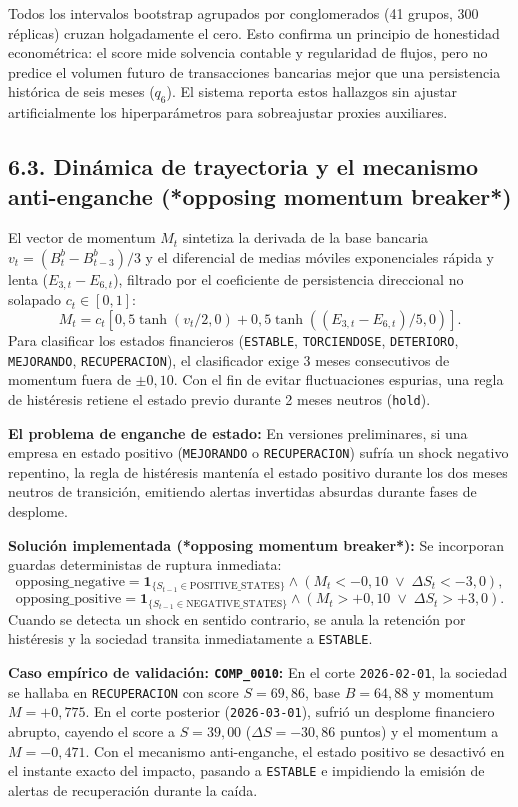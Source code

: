 \documentclass[10pt,a4paper]{article}
\begin{document}
Todos los intervalos bootstrap agrupados por conglomerados (41 grupos, 300 réplicas) cruzan holgadamente el cero. Esto confirma un principio de honestidad econométrica: el score mide solvencia contable y regularidad de flujos, pero no predice el volumen futuro de transacciones bancarias mejor que una persistencia histórica de seis meses ($q_6$). El sistema reporta estos hallazgos sin ajustar artificialmente los hiperparámetros para sobreajustar proxies auxiliares.

\subsection*{6.3. Dinámica de trayectoria y el mecanismo anti-enganche (*opposing momentum breaker*)}
El vector de momentum $M_t$ sintetiza la derivada de la base bancaria $v_t = (B_t^b - B_{t-3}^b)/3$ y el diferencial de medias móviles exponenciales rápida y lenta ($E_{3,t} - E_{6,t}$), filtrado por el coeficiente de persistencia direccional no solapado $c_t \in [0, 1]$:
\[
M_t = c_t \left[ 0{,}5 \tanh(v_t / 2{,}0) + 0{,}5 \tanh((E_{3,t} - E_{6,t}) / 5{,}0) \right].
\]
Para clasificar los estados financieros (\texttt{ESTABLE}, \texttt{TORCIENDOSE}, \texttt{DETERIORO}, \texttt{MEJORANDO}, \texttt{RECUPERACION}), el clasificador exige 3 meses consecutivos de momentum fuera de $\pm 0{,}10$. Con el fin de evitar fluctuaciones espurias, una regla de histéresis retiene el estado previo durante 2 meses neutros (\texttt{hold}).

\textbf{El problema de enganche de estado:} En versiones preliminares, si una empresa en estado positivo (\texttt{MEJORANDO} o \texttt{RECUPERACION}) sufría un shock negativo repentino, la regla de histéresis mantenía el estado positivo durante los dos meses neutros de transición, emitiendo alertas invertidas absurdas durante fases de desplome.

\textbf{Solución implementada (*opposing momentum breaker*):} Se incorporan guardas deterministas de ruptura inmediata:
\[
\text{opposing\_negative} = \mathbf{1}_{\{S_{t-1} \in \text{POSITIVE\_STATES}\}} \land \left( M_t < -0{,}10 \;\lor\; \Delta S_t < -3{,}0 \right),
\]
\[
\text{opposing\_positive} = \mathbf{1}_{\{S_{t-1} \in \text{NEGATIVE\_STATES}\}} \land \left( M_t > +0{,}10 \;\lor\; \Delta S_t > +3{,}0 \right).
\]
Cuando se detecta un shock en sentido contrario, se anula la retención por histéresis y la sociedad transita inmediatamente a \texttt{ESTABLE}.

\textbf{Caso empírico de validación: \texttt{COMP\_0010}:} En el corte \texttt{2026-02-01}, la sociedad se hallaba en \texttt{RECUPERACION} con score $S = 69{,}86$, base $B = 64{,}88$ y momentum $M = +0{,}775$. En el corte posterior (\texttt{2026-03-01}), sufrió un desplome financiero abrupto, cayendo el score a $S = 39{,}00$ ($\Delta S = -30{,}86$ puntos) y el momentum a $M = -0{,}471$. Con el mecanismo anti-enganche, el estado positivo se desactivó en el instante exacto del impacto, pasando a \texttt{ESTABLE} e impidiendo la emisión de alertas de recuperación durante la caída.
\end{document}
